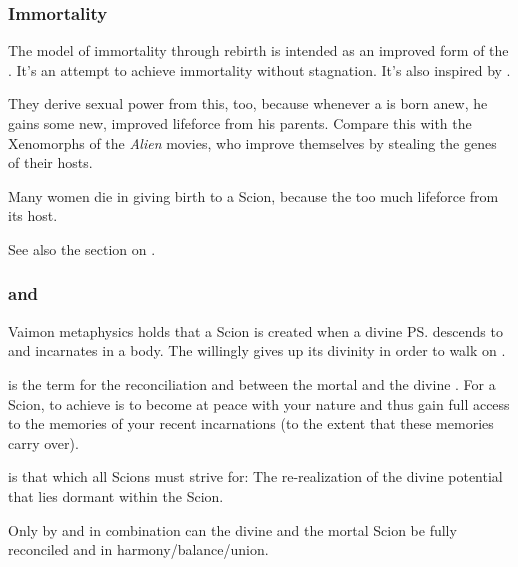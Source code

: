 \subsubsection{Immortality}
The \Malach{} model of immortality through rebirth is intended as an improved form of the . It's an attempt to achieve immortality without stagnation. It's also inspired by . 

They derive sexual power from this, too, because whenever a \malach{} is born anew, he gains some new, improved lifeforce from his parents. Compare this with the Xenomorphs of the \emph{Alien} movies, who improve themselves by stealing the genes of their hosts. 

Many women die in giving birth to a Scion, because the \malach{}  too much lifeforce from its host. 

See also the section on . 





\subsubsection{\Kenosis{} and \Apotheosis}
\index{\kenosis}
\index{\apotheosis}
Vaimon metaphysics holds that a Scion is created when a divine \ps{\Malach}{} descends to \Miith{} and incarnates in a \human{} body. 
The \Malach{} willingly gives up its divinity in order to walk on \Miith{}. 

\quo{\Kenosis} is the term for the reconciliation and between the mortal \human{} and the divine \malach. 
For a Scion, to achieve \kenosis{} is to become at peace with your nature and thus gain full access to the memories of your recent incarnations (to the extent that these memories carry over). 

\quo{\Apotheosis} is that which all Scions must strive for: 
The re-realization of the divine potential that lies dormant within the Scion. 

Only by \Kenosis{} and \Apotheosis{} in combination can the divine \Malach{} and the mortal Scion be fully reconciled and in harmony/balance/union. 










